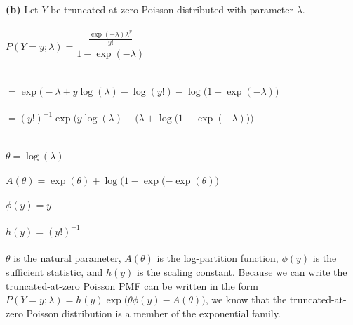 \documentclass[submit]{harvardml}
\begin{document}
\textbf{(b)} Let $Y$ be truncated-at-zero Poisson distributed with parameter $\lambda$.\\\\
$P(Y=y;\lambda)=\dfrac{\frac{\exp(-\lambda)\lambda^y}{y!}}{1-\exp(-\lambda)}$\\\\\\
$=\exp\big(-\lambda+y\log(\lambda)-\log(y!)-\log(1-\exp(-\lambda)\big)$\\\\
$=(y!)^{-1}\exp\Big(y\log(\lambda)-\big(\lambda+\log(1-\exp(-\lambda)\big)\Big)$\\\\\\
$\theta=\log(\lambda)$\\\\
$A(\theta)=\exp(\theta)+\log\big(1-\exp(-\exp(\theta)\big)$\\\\
$\phi(y)=y$\\\\
$h(y)=(y!)^{-1}$\\\\
$\theta$ is the natural parameter, $A(\theta)$ is the log-partition function, $\phi(y)$ is the sufficient statistic, and $h(y)$ is the scaling constant. Because we can write the truncated-at-zero Poisson PMF can be written in the form\\ $P(Y=y;\lambda)=h(y)\exp\big(\theta\phi(y)-A(\theta)\big)$, we know that the truncated-at-zero Poisson distribution is a member of the exponential family.\\\\\\
\end{document}
